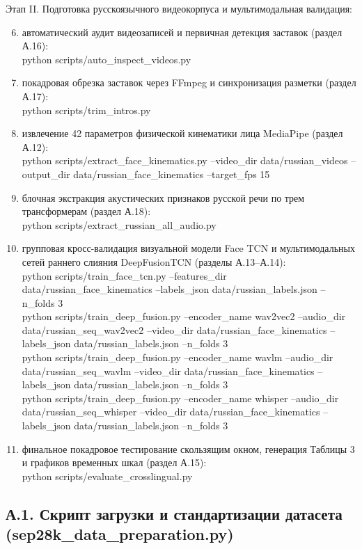 \documentclass[a4paper,14pt]{extarticle}
\begin{document}
	Этап II. Подготовка русскоязычного видеокорпуса и мультимодальная валидация:
	\begin{enumerate}
		\setcounter{enumi}{5}
		\item автоматический аудит видеозаписей и первичная детекция заставок (раздел А.16):\\
		python scripts/auto\_inspect\_videos.py
		\item покадровая обрезка заставок через FFmpeg и синхронизация разметки (раздел А.17):\\
		python scripts/trim\_intros.py
		\item извлечение 42 параметров физической кинематики лица MediaPipe (раздел А.12):\\
		python scripts/extract\_face\_kinematics.py --video\_dir data/russian\_videos --output\_dir data/russian\_face\_kinematics --target\_fps 15
		\item блочная экстракция акустических признаков русской речи по трем трансформерам (раздел А.18):\\
		python scripts/extract\_russian\_all\_audio.py
		\item групповая кросс-валидация визуальной модели Face TCN и мультимодальных сетей раннего слияния DeepFusionTCN (разделы А.13--А.14):\\
		python scripts/train\_face\_tcn.py --features\_dir data/russian\_face\_kinematics --labels\_json data/russian\_labels.json --n\_folds 3\\
		python scripts/train\_deep\_fusion.py --encoder\_name wav2vec2 --audio\_dir data/russian\_seq\_wav2vec2 --video\_dir data/russian\_face\_kinematics --labels\_json data/russian\_labels.json --n\_folds 3\\
		python scripts/train\_deep\_fusion.py --encoder\_name wavlm --audio\_dir data/russian\_seq\_wavlm --video\_dir data/russian\_face\_kinematics --labels\_json data/russian\_labels.json --n\_folds 3\\
		python scripts/train\_deep\_fusion.py --encoder\_name whisper --audio\_dir data/russian\_seq\_whisper --video\_dir data/russian\_face\_kinematics --labels\_json data/russian\_labels.json --n\_folds 3
		\item финальное покадровое тестирование скользящим окном, генерация Таблицы 3 и графиков временных шкал (раздел А.15):\\
		python scripts/evaluate\_crosslingual.py
	\end{enumerate}
	
	\subsection*{А.1. Скрипт загрузки и стандартизации датасета (sep28k\_data\_preparation.py)}
	
	
\end{document}
